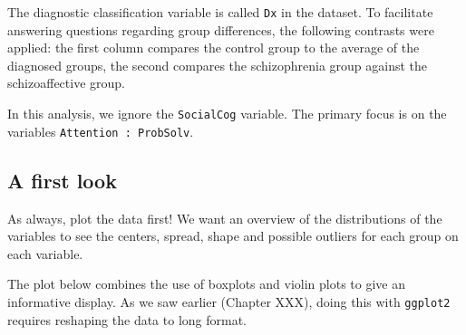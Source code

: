 \documentclass[
  letterpaper,
  10pt,
  krantz2]{krantz}
\makeatletter
\newenvironment{Shaded}{\begin{snugshade}}{\end{snugshade}}
\newcommand{\CommentTok}[1]{\textcolor[rgb]{0.37,0.37,0.37}{#1}}
\newcommand{\FunctionTok}[1]{\textcolor[rgb]{0.28,0.35,0.67}{#1}}
\newcommand{\NormalTok}[1]{\textcolor[rgb]{0.00,0.23,0.31}{#1}}
\newcommand{\SpecialCharTok}[1]{\textcolor[rgb]{0.37,0.37,0.37}{#1}}
\newenvironment{kframe}{%
  \medskip{}
  \setlength{\fboxsep}{.8em}
  \def\at@end@of@kframe{}%
  \ifinner\ifhmode%
  \def\at@end@of@kframe{\end{minipage}}%
  \begin{minipage}{\columnwidth}%
  \fi\fi%
  \def\FrameCommand##1{\hskip\@totalleftmargin \hskip-\fboxsep
  \colorbox{shadecolor}{##1}\hskip-\fboxsep
      \hskip-\linewidth \hskip-\@totalleftmargin \hskip\columnwidth}%
  \MakeFramed {\advance\hsize-\width
    \@totalleftmargin\z@ \linewidth\hsize
    \@setminipage}}%
{\par\unskip\endMakeFramed%
  \at@end@of@kframe}
\renewenvironment{Shaded}{\begin{kframe}}{\end{kframe}}
\makeatother
\begin{document}
The diagnostic classification variable is called \texttt{Dx} in the
dataset. To facilitate answering questions regarding group differences,
the following contrasts were applied: the first column compares the
control group to the average of the diagnosed groups, the second
compares the schizophrenia group against the schizoaffective group.

\begin{Shaded}
\end{Shaded}

In this analysis, we ignore the \texttt{SocialCog} variable. The primary
focus is on the variables \texttt{Attention\ :\ ProbSolv}.

\subsection{A first look}\label{a-first-look}

As always, plot the data first! We want an overview of the distributions
of the variables to see the centers, spread, shape and possible outliers
for each group on each variable.

The plot below combines the use of boxplots and violin plots to give an
informative display. As we saw earlier (Chapter XXX), doing this with
\texttt{ggplot2} requires reshaping the data to long format.
\end{document}
